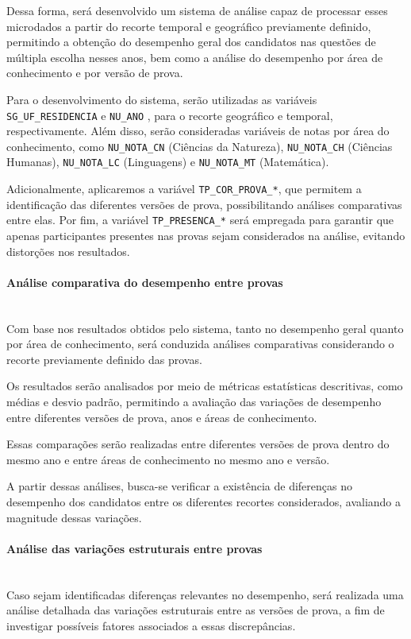 \documentclass[a4paper,10pt, twocolumn]{article}
\begin{document}
Dessa forma, será desenvolvido um sistema de análise capaz de processar esses microdados a partir do recorte temporal e geográfico previamente definido, permitindo a obtenção do desempenho geral dos candidatos nas questões de múltipla escolha nesses anos, bem como a análise do desempenho por área de conhecimento e por versão de prova.

Para o desenvolvimento do sistema, serão utilizadas as variáveis  \texttt{SG\_UF\_RESIDENCIA} e \texttt{NU\_ANO} , para o recorte geográfico e temporal, respectivamente. Além disso, serão consideradas variáveis de notas por área do conhecimento, como  \texttt{NU\_NOTA\_CN} (Ciências da Natureza),  \texttt{NU\_NOTA\_CH}  (Ciências Humanas),  \texttt{NU\_NOTA\_LC} (Linguagens) e \texttt{NU\_NOTA\_MT} (Matemática).

Adicionalmente, aplicaremos a variável \texttt{TP\_COR\_PROVA\_*}, que permitem a identificação das diferentes versões de prova, possibilitando análises comparativas entre elas. Por fim, a variável \texttt{TP\_PRESENCA\_*} será empregada para garantir que apenas participantes presentes nas provas sejam considerados na análise, evitando distorções nos resultados.

\paragraph{Análise comparativa do desempenho entre provas}
\mbox{}\\
Com base nos resultados obtidos pelo sistema, tanto no desempenho geral quanto por área de conhecimento, será conduzida análises comparativas considerando o recorte previamente definido das provas.

Os resultados serão analisados por meio de métricas estatísticas descritivas, como médias e desvio padrão, permitindo a avaliação das variações de desempenho entre diferentes versões de prova, anos e áreas de conhecimento.

Essas comparações serão realizadas entre diferentes versões de prova dentro do mesmo ano e entre áreas de conhecimento no mesmo ano e versão.

A partir dessas análises, busca-se verificar a existência de diferenças no desempenho dos candidatos entre os diferentes recortes considerados, avaliando a magnitude dessas variações.

\paragraph{Análise das variações estruturais entre provas}
\mbox{}\\
Caso sejam identificadas diferenças relevantes no desempenho, será realizada uma análise detalhada das variações estruturais entre as versões de prova, a fim de investigar possíveis fatores associados a essas discrepâncias.
\end{document}
